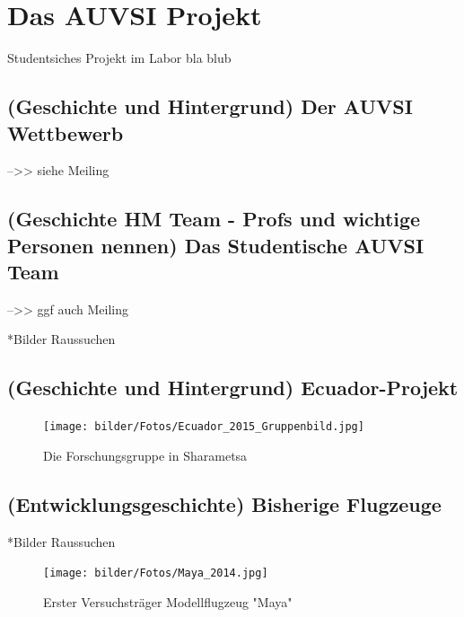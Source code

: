\chapter{Das AUVSI Projekt}\label{cha:Das AUVSI Projekt}

Studentsiches Projekt im Labor  bla blub

\section{(Geschichte und Hintergrund) Der AUVSI Wettbewerb}

\cite{AUVSIrules}

\cite{Meiling}

-->> siehe Meiling 

\section{(Geschichte HM Team - Profs und wichtige Personen nennen) Das Studentische AUVSI Team}

-->> ggf auch Meiling

*Bilder Raussuchen

\section{(Geschichte und Hintergrund) Ecuador-Projekt}

\cite{Niclas}

\begin{figure}[H]
\centering
\texttt{[image: bilder/Fotos/Ecuador\_2015\_Gruppenbild.jpg]} 
\caption{Die Forschungsgruppe in Sharametsa} 
\label{Die Forschungsgruppe in Sharametsa}
\end{figure}


\section{(Entwicklungsgeschichte) Bisherige Flugzeuge}

*Bilder Raussuchen

\begin{figure}[H]
\centering
\texttt{[image: bilder/Fotos/Maya\_2014.jpg]} 
\caption{Erster Versuchsträger Modellflugzeug "Maya"} 
\label{Erster Versuchsträger Modellflugzeug "Maya"}
\end{figure}

